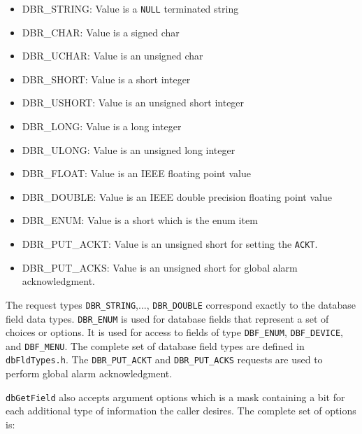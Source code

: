 \begin{itemize}

\item {}DBR\_STRING: Value is a \verb|NULL| terminated string

\item {}DBR\_CHAR: Value is a signed char

\item {}DBR\_UCHAR: Value is an unsigned char

\item {}DBR\_SHORT: Value is a short integer

\item {}DBR\_USHORT: Value is an unsigned short integer

\item {}DBR\_LONG: Value is a long integer

\item {}DBR\_ULONG: Value is an unsigned long integer

\item {}DBR\_FLOAT: Value is an IEEE floating point value

\item {}DBR\_DOUBLE: Value is an IEEE double precision floating point value

\item {}DBR\_ENUM: Value is a short which is the enum item

\item {}DBR\_PUT\_ACKT: Value is an unsigned short for setting the \verb|ACKT|.

\item {}DBR\_PUT\_ACKS: Value is an unsigned short for global alarm acknowledgment.

\end{itemize}

The request types \verb|DBR_STRING|,..., \verb|DBR_DOUBLE| correspond exactly to the database field data types.
\verb|DBR_ENUM| is used for database fields that represent a set of choices or options.
It is used for access to fields of type \verb|DBF_ENUM|, \verb|DBF_DEVICE|, and \verb|DBF_MENU|.
The complete set of database field types are defined in \verb|dbFldTypes.h|.
The \verb|DBR_PUT_ACKT| and \verb|DBR_PUT_ACKS| requests are used to perform global alarm acknowledgment.

\verb|dbGetField| also accepts argument options which is a mask containing a bit for each additional type of information the caller desires.
The complete set of options is:

